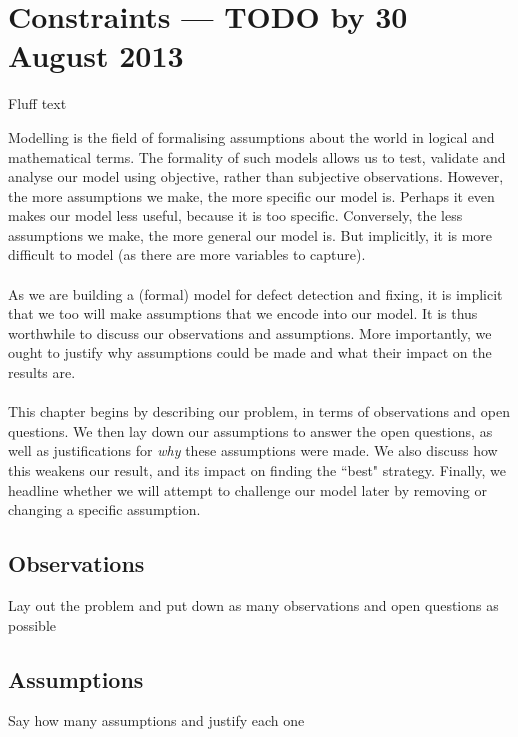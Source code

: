 \section{Constraints --- TODO by 30 August 2013}

\FIXME Fluff text

Modelling is the field of formalising assumptions about the world in logical and mathematical terms.
The formality of such models allows us to test, validate and analyse our model using objective, rather than subjective observations.
However, the more assumptions we make, the more specific our model is.
Perhaps it even makes our model less useful, because it is too specific.
Conversely, the less assumptions we make, the more general our model is.
But implicitly, it is more difficult to model (as there are more variables to capture).\\
\\
As we are building a (formal) model for defect detection and fixing, it is implicit that we too will make assumptions that we encode into our model.
It is thus worthwhile to discuss our observations and assumptions.
More importantly, we ought to justify why assumptions could be made and what their impact on the results are.\\
\\
This chapter begins by describing our problem, in terms of observations and open questions.
We then lay down our assumptions to answer the open questions, as well as justifications for {\em why} these assumptions were made.
We also discuss how this weakens our result, and its impact on finding the ``best" strategy.
Finally, we headline whether we will attempt to challenge our model later by removing or changing a specific assumption.

\subsection{Observations}

\FIXME Lay out the problem and put down as many observations and open questions
as possible

\subsection{Assumptions}

\FIXME Say how many assumptions and justify each one
